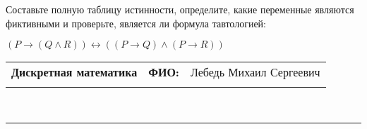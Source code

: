\documentclass[10pt]{exam}
\newcommand{\class}{Дискретная математика}
\newcommand{\examdate}{}
\begin{document}
\begin{questions}
\begin{enumerate} [a)]
\end{enumerate}\question Составьте полную таблицу истинности, определите, какие переменные являются фиктивными и проверьте, является ли формула тавтологией:

$(P \rightarrow (Q \land R)) \leftrightarrow ((P \rightarrow Q) \land (P \rightarrow R))$

\end{questions}
\newpage
\begin{flushright}
\begin{tabular}{p{2.8in} r l}
\textbf{\class} & \textbf{ФИО:} &Лебедь Михаил Сергеевич
\\

\textbf{\examdate} &&\\
\end{tabular}\\
\end{flushright}
\rule[1ex]{\textwidth}{.1pt}
\end{document}
